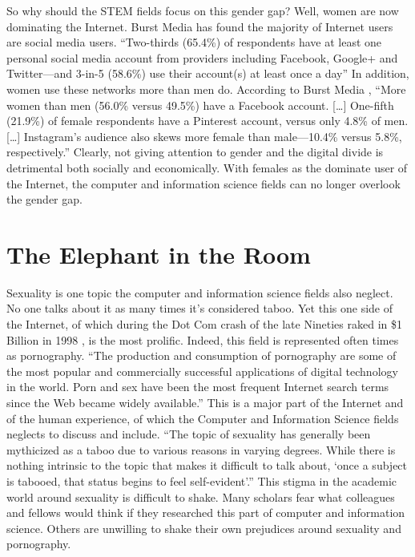\documentclass{acmsmall}
\begin{document}
So why should the STEM fields focus on this gender gap? Well, women are now dominating the Internet. Burst Media \citeyear{burst13} has found the majority of Internet users are social media users. ``Two-thirds (65.4\%) of respondents have at least one personal social media account from providers including Facebook, Google+ and Twitter---and 3-in-5 (58.6\%) use their account(s) at least once a day'' \cite{burst13} In addition, women use these networks more than men do. According to Burst Media \citeyear{burst13}, ``More women than men (56.0\% versus 49.5\%) have a Facebook account. [\ldots] One-fifth (21.9\%) of female respondents have a Pinterest account, 
versus only 4.8\% of men. [\ldots] Instagram's audience also skews more female than male---10.4\% versus 5.8\%, respectively.'' Clearly, not giving attention to gender and the digital divide is detrimental both socially and economically. With females as the dominate user of the Internet, the computer and information science fields can no longer overlook the gender gap.

\section{The Elephant in the Room}

Sexuality is one topic the computer and information science fields also neglect. No one talks about it as many times it's considered taboo. Yet this one side of the Internet, of which during the Dot Com crash of the late Nineties raked in \$1 Billion in 1998 \cite{branwyn99}, is the most prolific. Indeed, this field is represented often times as pornography. ``The production and consumption of pornography are some of the most popular and commercially successful applications of digital technology in the world. Porn and sex have been the most frequent Internet search terms since the Web became widely available.'' \cite{bell05} This is a major part of the Internet and of the human experience, of which the Computer and Information Science fields neglects to discuss and include. ``The topic of sexuality has generally been mythicized as a taboo due to various reasons in varying degrees. While there is nothing intrinsic to the topic that makes it difficult to talk about, `once a subject is tabooed, that status begins to feel self-evident'.'' \cite{kannabiran11} This stigma in the academic world around sexuality is difficult to shake. Many scholars fear what colleagues and fellows would think if they researched this part of computer and information science. Others are unwilling to shake their own prejudices around sexuality and pornography.
\end{document}

